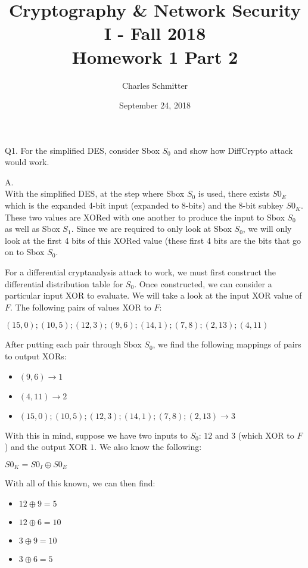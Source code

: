 \documentclass[11pt]{article}
\title{Cryptography \& Network Security I - Fall 2018\\ \large Homework 1 Part 2}
\author{Charles Schmitter}
\date{September 24, 2018}
\newcommand{\tab}{\hspace{10mm}}
\newcommand{\gap}{\vspace{5mm}}
\begin{document}
\maketitle

Q1. For the simplified DES, consider Sbox $S_0$ and show how DiffCrypto attack would work.

\gap{}

A.\\
\tab With the simplified DES, at the step where Sbox $S_0$ is used, there exists $S0_E$ which is the expanded 4-bit input (expanded to 8-bits) and the 8-bit subkey $S0_K$. These two values are XORed with one another to produce the input to Sbox $S_0$ as well as Sbox $S_1$. Since we are required to only look at Sbox $S_0$, we will only look at the first 4 bits of this XORed value (these first 4 bits are the bits that go on to Sbox $S_0$.

\tab For a differential cryptanalysis attack to work, we must first construct the differential distribution table for $S_0$. Once constructed, we can consider a particular input XOR to evaluate. We will take a look at the input XOR value of $F$. The following pairs of values XOR to $F$:

\begin{center}
$(15, 0); (10, 5); (12, 3); (9, 6); (14, 1); (7, 8); (2, 13); (4, 11)$
\end{center}

After putting each pair through Sbox $S_0$, we find the following mappings of pairs to output XORs:
\begin{itemize}
\item $(9, 6) \rightarrow 1$
\item $(4, 11) \rightarrow 2$
\item $(15, 0); (10, 5); (12, 3); (14, 1); (7, 8); (2, 13) \rightarrow 3$
\end{itemize}

With this in mind, suppose we have two inputs to $S_0$: $12$ and $3$ (which XOR to $F$) and the output XOR $1$. We also know the following:

\begin{center}
$S0_K = S0_I \oplus S0_E$
\end{center}

With all of this known, we can then find:

\begin{itemize}
\item $12 \oplus 9 = 5$
\item $12 \oplus 6 = 10$
\item $3 \oplus 9 = 10$
\item $3\oplus 6 = 5$
\end{itemize}
\end{document}
